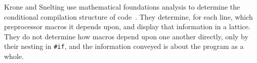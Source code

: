 \documentclass[11pt]{article}
\begin{document}

Krone and Snelting use mathematical foundations analysis to determine the
conditional compilation structure of code~\cite{Krone94}.  They determine,
for each line, which preprocessor macros it depends upon, and display that
information in a lattice.  They do not determine how macros depend upon one
another directly, only by their nesting in {\tt \#if}, and the information
conveyed is about the program as a whole.


{\small }
\end{document}
